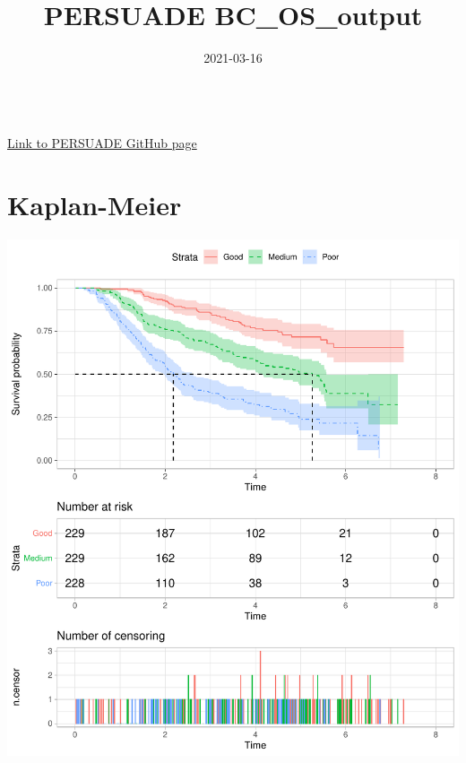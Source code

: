 \documentclass[]{article}
\title{PERSUADE BC\_OS\_output}
\author{}
\date{\vspace{-2.5em}2021-03-16}
\begin{document}
\maketitle

{
\hypersetup{linkcolor=black}
\setcounter{tocdepth}{2}
\tableofcontents
}
~\\
\href{https://github.com/Bram-R/PERSUADE}{Link to PERSUADE GitHub page}
\newpage

\section{Kaplan-Meier}\label{kaplan-meier}

\begin{flushleft}\includegraphics{Images/plot_KM-1} \end{flushleft}
\end{document}
